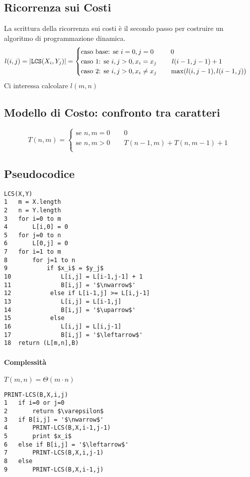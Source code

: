 \subsection{Ricorrenza sui Costi}
La scrittura della ricorrenza sui costi è il secondo passo per costruire un algoritmo di programmazione dinamica.
\begin{equation*}
l(i,j) = |\verb|LCS|(X_i,Y_j)| = 
\begin{cases}
    \text{caso base: se } i=0, j=0 \qquad\;\; 0 \\
    \text{caso 1: se } i,j>0, x_i = x_j \qquad\; l(i-1,j-1)+1 \\
    \text{caso 2: se } i,j>0, x_i \not= x_j \qquad \max(l(i,j-1),l(i-1,j))
\end{cases}
\end{equation*}
Ci interessa calcolare $l(m,n)$

\subsection{Modello di Costo: confronto tra caratteri}
\begin{equation*}
    T(n,m) =
    \begin{cases}
        \text{se } n,m=0 \qquad 0 \\
        \text{se } n,m>0 \qquad T(n-1,m) + T(n,m-1) + 1 \\
    \end{cases}
\end{equation*}

\newpage
\subsection{Pseudocodice}
\begin{mdframed}
\begin{lstlisting}[mathescape=true]
LCS(X,Y)
1   m = X.length
2   n = Y.length
3   for i=0 to m
4       L[i,0] = 0
5   for j=0 to n
6       L[0,j] = 0
7   for i=1 to m
8       for j=1 to n
9           if $x_i$ = $y_j$
10              L[i,j] = L[i-1,j-1] + 1
11              B[i,j] = '$\nwarrow$'
12           else if L[i-1,j] >= L[i,j-1]
13              L[i,j] = L[i-1,j]
14              B[i,j] = '$\uparrow$'
15           else
16              L[i,j] = L[i,j-1]
17              B[i,j] = '$\leftarrow$'
18  return (L[m,n],B)
\end{lstlisting}
\end{mdframed}
\paragraph{Complessità} $T(m,n) = \Theta (m \cdot n)$	
\begin{mdframed}
\begin{lstlisting}[mathescape=true]
PRINT-LCS(B,X,i,j)
1   if i=0 or j=0
2       return $\varepsilon$
3   if B[i,j] = '$\nwarrow$'
4       PRINT-LCS(B,X,i-1,j-1)
5       print $x_i$
6   else if B[i,j] = '$\leftarrow$'
7       PRINT-LCS(B,X,i,j-1)
8   else
9       PRINT-LCS(B,X,i-1,j)
\end{lstlisting}
\end{mdframed}
